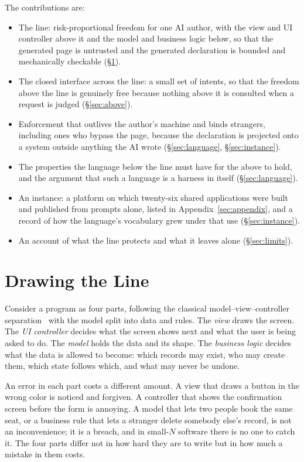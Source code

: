 \documentclass[11pt]{article}
\begin{document}
The contributions are:
\begin{itemize}
\item The line: risk-proportional freedom for one AI author, with the view and UI controller above it and the model and business logic below, so that the generated page is untrusted and the generated declaration is bounded and mechanically checkable (\S\ref{sec:line}).
\item The closed interface across the line: a small set of intents, so that the freedom above the line is genuinely free because nothing above it is consulted when a request is judged (\S\ref{sec:above}).
\item Enforcement that outlives the author's machine and binds strangers, including ones who bypass the page, because the declaration is projected onto a system outside anything the AI wrote (\S\ref{sec:language}, \S\ref{sec:instance}).
\item The properties the language below the line must have for the above to hold, and the argument that such a language is a harness in itself (\S\ref{sec:language}).
\item An instance: a platform on which twenty-six shared applications were built and published from prompts alone, listed in Appendix~\ref{sec:appendix}, and a record of how the language's vocabulary grew under that use (\S\ref{sec:instance}).
\item An account of what the line protects and what it leaves alone (\S\ref{sec:limits}).
\end{itemize}

\section{Drawing the Line}
\label{sec:line}

Consider a program as four parts, following the classical model--view--controller separation~\cite{krasner1988mvc} with the model split into data and rules. The \emph{view} draws the screen. The \emph{UI controller} decides what the screen shows next and what the user is being asked to do. The \emph{model} holds the data and its shape. The \emph{business logic} decides what the data is allowed to become: which records may exist, who may create them, which state follows which, and what may never be undone.

An error in each part costs a different amount. A view that draws a button in the wrong color is noticed and forgiven. A controller that shows the confirmation screen before the form is annoying. A model that lets two people book the same seat, or a business rule that lets a stranger delete somebody else's record, is not an inconvenience; it is a breach, and in small-$N$ software there is no one to catch it. The four parts differ not in how hard they are to write but in how much a mistake in them costs.
\end{document}
